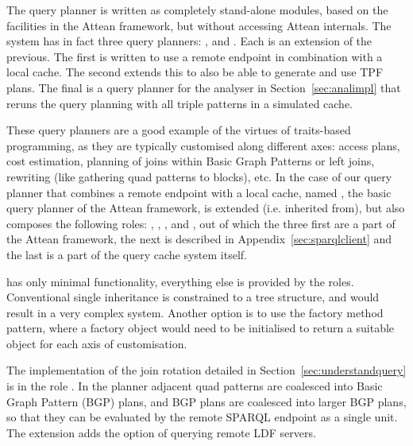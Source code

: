 The query planner is written as completely stand-alone modules, based
on the facilities in the Attean framework, but without accessing
Attean internals. The system has in fact three query planners:
,
 and
. Each is an
extension of the previous. The first is written to use a remote
endpoint in combination with a local cache. The second extends this to
also be able to generate and use TPF plans. The
final is a query planner for the analyser in Section~\ref{sec:analimpl}
that reruns the query planning with all triple patterns in a simulated
cache.

These query planners are a good example of the virtues of traits-based
programming, as they are typically customised along different axes:
access plans, cost estimation, planning of joins within Basic Graph
Patterns or left joins, rewriting (like gathering quad patterns to
blocks), etc. In the case of our query planner that combines a remote
endpoint with a local cache, named
, the basic query planner of the
Attean framework,  is extended
(i.e. inherited from), but also composes the following roles:
,
,
,
 and
, out of which the three
first are a part of the Attean framework, the next is described in
Appendix~\ref{sec:sparqlclient} and the last is a part of the
query cache system itself.


 has only minimal functionality,
everything else is provided by the roles. Conventional single
inheritance is constrained to a tree structure, and would result in a
very complex system. Another option is to use the factory method
pattern, where a factory object would need to be initialised to return
a suitable object for each axis of customisation. 

The implementation of the join rotation detailed in
Section~\ref{sec:understandquery} is in the role
. In the planner
 adjacent quad patterns are
coalesced into Basic Graph Pattern (BGP) plans, and BGP plans are
coalesced into larger BGP plans, so that they can be evaluated by the
remote SPARQL endpoint as a single unit. The extension
 adds the option of
querying remote LDF servers.

